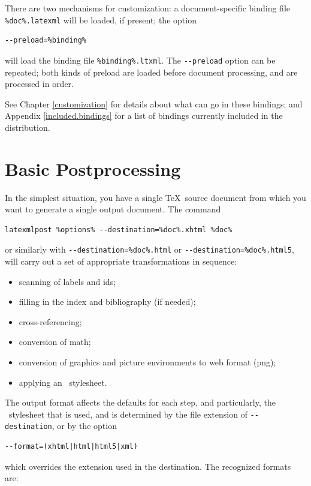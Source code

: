 \documentclass{book}
\newcommand{\shellcode}{\lstinline[style=shell]}
\begin{document}
There are two mechanisms for customization:
a document-specific binding file \shellcode|%
be loaded, if present;
the option
\begin{lstlisting}[style=shell]
--preload=%binding%
\end{lstlisting}
will load the binding file \shellcode|%
The \shellcode|--preload| option can be repeated;
both kinds of preload are loaded before document processing,
and are processed in order.

See Chapter \ref{customization} for details about what can go in these bindings;
and Appendix \ref{included.bindings} for a list of bindings currently
included in the distribution.


\section[Postprocessing]{Basic Postprocessing}\label{usage.single}
In the simplest situation, you have a single \TeX\ source document
from which you want to generate a single output document.
The command
\begin{lstlisting}[style=shell]
latexmlpost %options% --destination=%doc%.xhtml %doc%
\end{lstlisting}
or similarly with
\shellcode|--destination=%
\shellcode|--destination=%
will carry out a set of appropriate transformations in sequence:
\begin{itemize}
  \item scanning of labels and ids;
  \item filling in the index and bibliography (if needed);
  \item cross-referencing;
  \item conversion of math;
  \item conversion of graphics and picture environments to web format (png);
  \item applying an \XSLT\ stylesheet.
\end{itemize}
The output format affects the defaults for each step, and particularly,
the \XSLT\ stylesheet that is used, and is determined
by the file extension of \shellcode{--destination}, or by the option
\begin{lstlisting}[style=shell]
--format=(xhtml|html|html5|xml)
\end{lstlisting}
which overrides the extension used in the destination. The recognized formats are:
\end{document}
